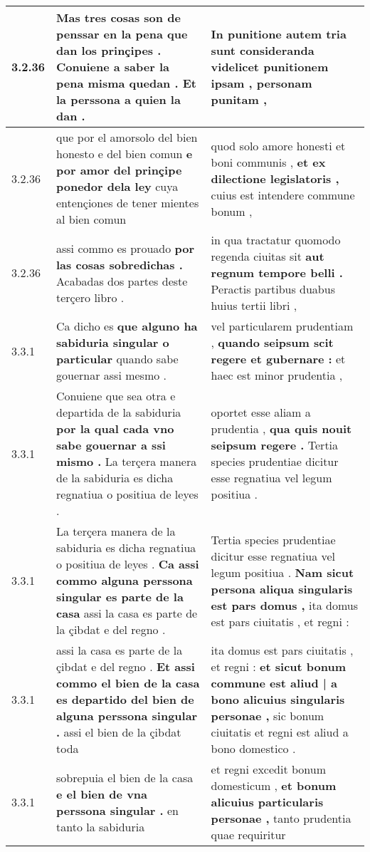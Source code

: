 \begin{tabular}{|p{1cm}|p{6.5cm}|p{6.5cm}|}
3.2.36 & Mas tres cosas son de penssar en la pena que dan los prinçipes . \textbf{ Conuiene a saber la pena misma quedan . } Et la perssona a quien la dan . & In punitione autem tria sunt consideranda \textbf{ videlicet punitionem ipsam , } personam punitam , \\\hline
3.2.36 & que por el amorsolo del bien honesto e del bien comun \textbf{ e por amor del prinçipe ponedor dela ley } cuya entençiones de tener mientes al bien comun & quod solo amore honesti et boni communis , \textbf{ et ex dilectione legislatoris , } cuius est intendere commune bonum , \\\hline
3.2.36 & assi commo es prouado \textbf{ por las cosas sobredichas . } Acabadas dos partes deste terçero libro . & in qua tractatur quomodo regenda ciuitas sit \textbf{ aut regnum tempore belli . } Peractis partibus duabus huius tertii libri , \\\hline
3.3.1 & Ca dicho es \textbf{ que alguno ha sabiduria singular o particular } quando sabe gouernar assi mesmo . & vel particularem prudentiam , \textbf{ quando seipsum scit regere et gubernare : } et haec est minor prudentia , \\\hline
3.3.1 & Conuiene que sea otra e departida de la sabiduria \textbf{ por la qual cada vno sabe gouernar a ssi mismo . } La terçera manera de la sabiduria es dicha regnatiua o positiua de leyes . & oportet esse aliam a prudentia , \textbf{ qua quis nouit seipsum regere . } Tertia species prudentiae dicitur esse regnatiua vel legum positiua . \\\hline
3.3.1 & La terçera manera de la sabiduria es dicha regnatiua o positiua de leyes . \textbf{ Ca assi commo alguna perssona singular es parte de la casa } assi la casa es parte de la çibdat e del regno . & Tertia species prudentiae dicitur esse regnatiua vel legum positiua . \textbf{ Nam sicut persona aliqua singularis est pars domus , } ita domus est pars ciuitatis , et regni : \\\hline
3.3.1 & assi la casa es parte de la çibdat e del regno . \textbf{ Et assi commo el bien de la casa es departido del bien de alguna perssona singular . } assi el bien de la çibdat toda & ita domus est pars ciuitatis , et regni : \textbf{ et sicut bonum commune est aliud | a bono alicuius singularis personae , } sic bonum ciuitatis et regni est aliud a bono domestico . \\\hline
3.3.1 & sobrepuia el bien de la casa \textbf{ e el bien de vna perssona singular . } en tanto la sabiduria & et regni excedit bonum domesticum , \textbf{ et bonum alicuius particularis personae , } tanto prudentia quae requiritur \\\hline

\end{tabular}
